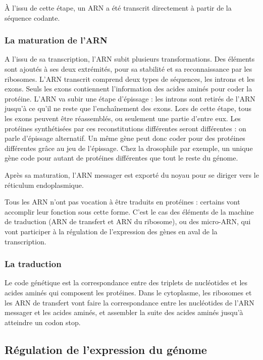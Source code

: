 À l'issu de cette étape, un ARN a été transcrit directement à partir de la séquence codante. 

\subsubsection{La maturation de l'ARN}

A l'issu de sa transcription, l'ARN subit plusieurs transformations. Des éléments sont ajoutés à ses deux extrémités, pour sa stabilité et sa reconnaissance par les ribosomes. 
L'ARN transcrit comprend deux types de séquences, les introns et les exons. Seuls les exons contiennent l'information des acides aminés pour coder la protéine. 
L'ARN va subir une étape d'épissage : les introns sont retirés de l'ARN jusqu'à ce qu'il ne reste que l'enchaînement des exons. Lors de cette étape, tous les exons peuvent être réassemblés, ou seulement une partie d'entre eux. Les protéines synthétisées par ces reconstitutions différentes seront différentes : on parle d'épissage alternatif. 
Un même gène peut donc coder pour des protéines différentes grâce au jeu de l'épissage. Chez la drosophile par exemple, un unique gène code pour autant de protéines différentes que tout le reste du génome. 

Après sa maturation, l'ARN messager est exporté du noyau pour se diriger vers le réticulum endoplasmique.

Tous les ARN n'ont pas vocation à être traduits en protéines : certains vont accomplir leur fonction sous cette forme. C'est le cas des éléments de la machine de traduction (ARN de transfert et ARN du ribosome), ou des micro-ARN, qui vont participer à la régulation de l'expression des gènes en aval de la transcription.

\subsubsection{La traduction}

Le code génétique est la correspondance entre des triplets de nucléotides et les acides aminés qui composent les protéines. 
Dans le cytoplasme, les ribosomes et les ARN de transfert vont faire la correspondance entre les nucléotides de l'ARN messager et les acides aminés, et assembler la suite des acides aminés jusqu'à atteindre un codon stop. 


\subsection{Régulation de l'expression du génome}

